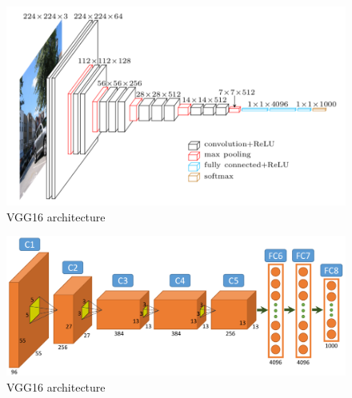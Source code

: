 \documentclass[12pt]{report}
\begin{document}
                    \begin{figure}[h]
                        \centering
                        \includegraphics[width=\textwidth]{images/vgg16.png}
                        \caption{VGG16 architecture}
                        \label{fig:vgg16}
                    \end{figure}
                    \begin{figure}[h]
                        \centering
                        \includegraphics[width=\textwidth]{images/alexnet.png}
                        \caption{VGG16 architecture}
                        \label{fig:alexnet}
                    \end{figure}
                    
                
    
\end{document}
